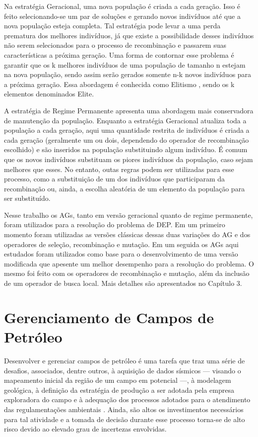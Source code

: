 Na estratégia Geracional, uma nova população é criada a cada geração. Isso é feito selecionando-se um par de soluções e gerando novos indivíduos até que a nova população esteja completa. Tal estratégia pode levar a uma perda prematura dos melhores indivíduos, já que existe a possibilidade desses indivíduos não serem selecionados para o processo de recombinação e passarem suas características a próxima geração. Uma forma de contornar esse problema é garantir que os k melhores indivíduos de uma população de tamanho n estejam na nova população, sendo assim serão gerados somente n-k novos indivíduos para a próxima geração. Essa abordagem é conhecida como Elitismo \cite{Talbi2009}, sendo os k elementos denominados Elite.

A estratégia de Regime Permanente apresenta uma abordagem mais conservadora de manutenção da população. Enquanto a estratégia Geracional atualiza toda a população a cada geração, aqui uma quantidade restrita de indivíduos é criada a cada geração (geralmente um ou dois, dependendo do operador de recombinação escolhido) e são inseridos na população substituindo algum indivíduo. É comum que os novos indivíduos substituam os piores indivíduos da população, caso sejam melhores que esses. No entanto, outas regras podem ser utilizadas para esse processo, como a substituição de um dos indivíduos que participaram da recombinação ou, ainda, a escolha aleatória de um elemento da população para ser substituído.

Nesse trabalho os AGs, tanto em versão geracional quanto de regime permanente, foram utilizados para a resolução do problema de DEP.  Em um primeiro momento foram utilizadas as versões clássicas dessas duas variações do AG e dos operadores de seleção, recombinação e mutação. Em um seguida os AGs aqui estudados foram utilizados como base para o desenvolvimento de uma versão modificada que apesente um melhor desempenho para a resolução do problema. O mesmo foi feito com os operadores de recombinação e mutação, além da inclusão de um operador de busca local. Mais detalhes são apresentados no Capítulo 3.

\section{Gerenciamento de Campos de Petróleo}
\label{sec:section22}
Desenvolver e gerenciar campos de petróleo é uma tarefa que traz uma série de desafios, associados, dentre outros, à aquisição de dados sísmicos — visando o mapeamento inicial da região de um campo em potencial —, à modelagem geológica, à definição da estratégia de produção a ser adotada pela empresa exploradora do campo e à adequação dos processos adotados para o atendimento das regulamentações ambientais \cite{Morais2013}. Ainda, são altos os investimentos necessários para tal atividade e a tomada de decisão durante esse processo torna-se de alto risco devido ao elevado grau de incertezas envolvidas.

